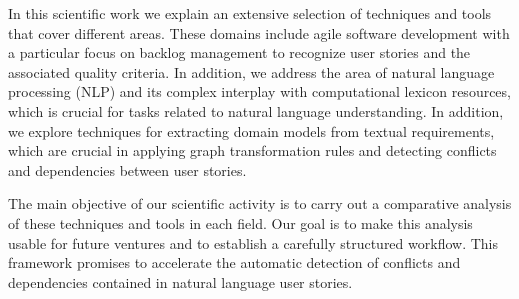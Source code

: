 In this scientific work we explain an extensive selection of techniques and tools that cover different areas. These domains include agile software development with a particular focus on backlog management to recognize user stories and the associated quality criteria. In addition, we address the area of natural language processing (NLP) and its complex interplay with computational lexicon resources, which is crucial for tasks related to natural language understanding. In addition, we explore techniques for extracting domain models from textual requirements, which are crucial in applying graph transformation rules and detecting conflicts and dependencies between user stories.

The main objective of our scientific activity is to carry out a comparative analysis of these techniques and tools in each field. Our goal is to make this analysis usable for future ventures and to establish a carefully structured workflow. This framework promises to accelerate the automatic detection of conflicts and dependencies contained in natural language user stories.